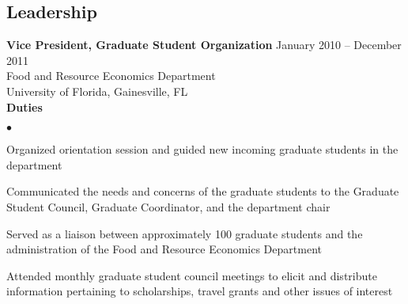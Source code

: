 \documentclass[margin,line]{res}
\newenvironment{list2}{
  \begin{list}{$\bullet$}{%
    \setlength{\itemsep}{0in}
    \setlength{\parsep}{0in} \setlength{\parskip}{0in}
    \setlength{\topsep}{0in} \setlength{\partopsep}{0in}
    \setlength{\leftmargin}{0.2in}}}{\end{list}}
\begin{document}
\begin{resume}
\section{\sc Leadership}
{\bf Vice President, Graduate Student Organization} \hfill{January 2010 -- December 2011} \\
Food and Resource Economics Department \\
University of Florida, Gainesville, FL\\
{\bf Duties}
\begin{list2}
\item Organized orientation session and guided new incoming graduate students in the department
\item Communicated the needs and concerns of the graduate students to the Graduate Student Council, Graduate Coordinator, and the department chair
\item Served as a liaison between approximately 100 graduate students and the administration of the Food and Resource Economics Department
\item Attended monthly graduate student council meetings to elicit and distribute information pertaining to scholarships, travel grants and other issues of interest
\end{list2}



\end{resume}
\end{document}
